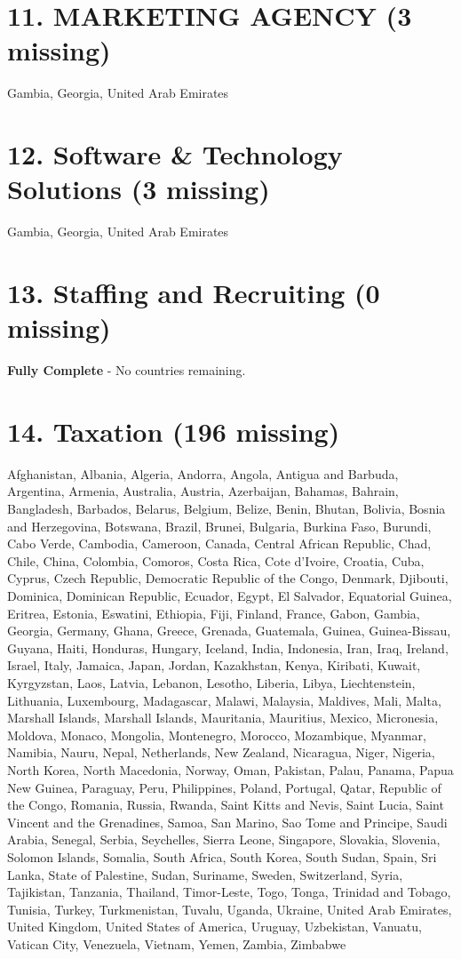 \documentclass{article}
\begin{document}
\section*{11. MARKETING AGENCY (3 missing)}
Gambia, Georgia, United Arab Emirates

\section*{12. Software \& Technology Solutions (3 missing)}
Gambia, Georgia, United Arab Emirates

\section*{13. Staffing and Recruiting (0 missing)}
\noindent \textbf{Fully Complete} - No countries remaining.

\section*{14. Taxation (196 missing)}
Afghanistan, Albania, Algeria, Andorra, Angola, Antigua and Barbuda, Argentina, Armenia, Australia, Austria, Azerbaijan, Bahamas, Bahrain, Bangladesh, Barbados, Belarus, Belgium, Belize, Benin, Bhutan, Bolivia, Bosnia and Herzegovina, Botswana, Brazil, Brunei, Bulgaria, Burkina Faso, Burundi, Cabo Verde, Cambodia, Cameroon, Canada, Central African Republic, Chad, Chile, China, Colombia, Comoros, Costa Rica, Cote d'Ivoire, Croatia, Cuba, Cyprus, Czech Republic, Democratic Republic of the Congo, Denmark, Djibouti, Dominica, Dominican Republic, Ecuador, Egypt, El Salvador, Equatorial Guinea, Eritrea, Estonia, Eswatini, Ethiopia, Fiji, Finland, France, Gabon, Gambia, Georgia, Germany, Ghana, Greece, Grenada, Guatemala, Guinea, Guinea-Bissau, Guyana, Haiti, Honduras, Hungary, Iceland, India, Indonesia, Iran, Iraq, Ireland, Israel, Italy, Jamaica, Japan, Jordan, Kazakhstan, Kenya, Kiribati, Kuwait, Kyrgyzstan, Laos, Latvia, Lebanon, Lesotho, Liberia, Libya, Liechtenstein, Lithuania, Luxembourg, Madagascar, Malawi, Malaysia, Maldives, Mali, Malta, Marshall Islands, Marshall Islands, Mauritania, Mauritius, Mexico, Micronesia, Moldova, Monaco, Mongolia, Montenegro, Morocco, Mozambique, Myanmar, Namibia, Nauru, Nepal, Netherlands, New Zealand, Nicaragua, Niger, Nigeria, North Korea, North Macedonia, Norway, Oman, Pakistan, Palau, Panama, Papua New Guinea, Paraguay, Peru, Philippines, Poland, Portugal, Qatar, Republic of the Congo, Romania, Russia, Rwanda, Saint Kitts and Nevis, Saint Lucia, Saint Vincent and the Grenadines, Samoa, San Marino, Sao Tome and Principe, Saudi Arabia, Senegal, Serbia, Seychelles, Sierra Leone, Singapore, Slovakia, Slovenia, Solomon Islands, Somalia, South Africa, South Korea, South Sudan, Spain, Sri Lanka, State of Palestine, Sudan, Suriname, Sweden, Switzerland, Syria, Tajikistan, Tanzania, Thailand, Timor-Leste, Togo, Tonga, Trinidad and Tobago, Tunisia, Turkey, Turkmenistan, Tuvalu, Uganda, Ukraine, United Arab Emirates, United Kingdom, United States of America, Uruguay, Uzbekistan, Vanuatu, Vatican City, Venezuela, Vietnam, Yemen, Zambia, Zimbabwe
\end{document}
